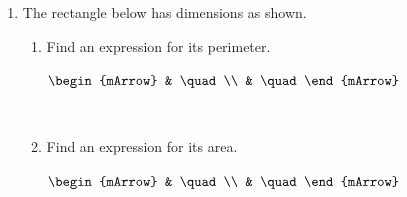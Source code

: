 \clearpage 
\begin{enumerate}[resume]	
  \item The rectangle below has dimensions as shown.
                         \begin{center}\end{center}
		\begin{enumerate}[label=(\alph*)]
           \item Find an expression for its perimeter.		   
               \begin{envSolution}[height=4cm]
		            $\begin{mArrow}
		               &  \quad                       \\ 
                       &  \quad      						  
	              \end{mArrow}$
               \end{envSolution}			  
	           \begin{shortsolution}$\quad$\end{shortsolution}
           \item Find an expression for its area.		   
               \begin{envSolution}[height=4cm]
		            $\begin{mArrow}
		               &  \quad                       \\ 
                       &  \quad      						  
	              \end{mArrow}$
               \end{envSolution}			  
	           \begin{shortsolution}$\quad$\end{shortsolution}
		\end{enumerate}
\end{enumerate}

